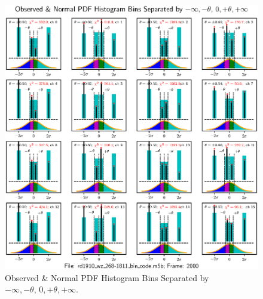 \documentclass[letterpaper,twoside,12pt]{article}
\begin{document}
\begin{figure}[ht!]
  \begin{center}
  \includegraphics[width=35pc]{fig_4x4_Histograms_bin_code_inserted.eps}
  \caption{\small Observed \& Normal PDF Histogram Bins Separated by $-\infty, -\theta, \, 0, +\theta, +\infty$.}
  \label{hists_bin_code_4x4}
  \end{center}
\end{figure}
\end{document}
